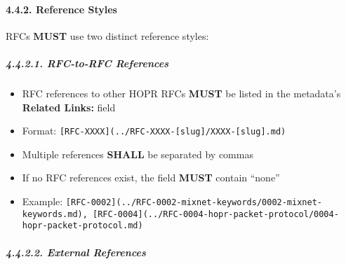 \begin{Shaded}
\begin{Highlighting}[]

\SpecialStringTok{{-} }
\SpecialStringTok{{-} }\CommentTok{[}\CommentTok{]}
\SpecialStringTok{{-} }
\SpecialStringTok{{-} }\CommentTok{[}\CommentTok{]}
\SpecialStringTok{{-} }
\SpecialStringTok{{-} }
\SpecialStringTok{{-} }
\SpecialStringTok{{-} }
\SpecialStringTok{{-} }\CommentTok{[}\CommentTok{](../RFC{-}XXXX{-}[slug]/XXXX{-}[slug].md)}
\end{Highlighting}
\end{Shaded}

\paragraph{4.4.2. Reference Styles}\label{reference-styles}

RFCs \textbf{MUST} use two distinct reference styles:

\subparagraph{4.4.2.1. RFC-to-RFC
References}\label{rfc-to-rfc-references}

\begin{itemize}
\tightlist
\item
  RFC references to other HOPR RFCs \textbf{MUST} be listed in the
  metadata's \textbf{Related Links:} field
\item
  Format:
  \texttt{{[}RFC-XXXX{]}(../RFC-XXXX-{[}slug{]}/XXXX-{[}slug{]}.md)}
\item
  Multiple references \textbf{SHALL} be separated by commas
\item
  If no RFC references exist, the field \textbf{MUST} contain ``none''
\item
  Example:
  \texttt{{[}RFC-0002{]}(../RFC-0002-mixnet-keywords/0002-mixnet-keywords.md),\ {[}RFC-0004{]}(../RFC-0004-hopr-packet-protocol/0004-hopr-packet-protocol.md)}
\end{itemize}

\subparagraph{4.4.2.2. External References}\label{external-references}

